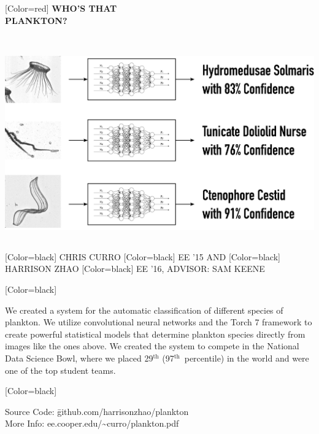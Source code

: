 \documentclass{article}
\begin{document}
\begin{minipage}[c]{20in}
{ 
[Color=red]
\fontsize{4in}{0.8in}\selectfont 
\bfseries
WHO'S THAT \vspace{0.5in}\\ PLANKTON?
}
\end{minipage}
\vspace{1in}\\
\colorbox{white}{
\begin{minipage}{28in}
\centering
\includegraphics[width=25in]{figure.pdf}
\end{minipage}
}
\vspace{1in}\\
{
[Color=black]
\fontsize{1in}{1em}\selectfont 
CHRIS CURRO
}
{
[Color=black]
\fontsize{0.8in}{1em}\selectfont 
EE '15 AND
}
{
[Color=black]
\fontsize{1in}{1em}\selectfont 
HARRISON ZHAO
}
{
[Color=black]
\fontsize{0.8in}{1em}\selectfont 
EE '16, ADVISOR: SAM KEENE
}
\vspace{0.8in}\\
\begin{minipage}{16.8in}
{
	[Color=black]
	\fontsize{0.6in}{8em}\selectfont

    We created a system for the automatic classification of different species
	of plankton. We utilize convolutional neural networks and the Torch 7 framework
	to create powerful statistical models that determine plankton species directly from
	images like the ones above. We created the system to compete in the National Data Science Bowl, 
	where we placed 29$^\text{th}$ (97$^\text{th}$~percentile) in the world and were one of the
	top student teams.


} \end{minipage} 
\hfill
\begin{minipage}{11in}
{
	[Color=black]
	\fontsize{0.6in}{8em}\selectfont
	\begin{tabbing}
	Source Code: \= github.com/harrisonzhao/plankton \\
	More Info: \> ee.cooper.edu/\textasciitilde{}curro/plankton.pdf
	\end{tabbing}
} 
\end{minipage} 
\end{document}
